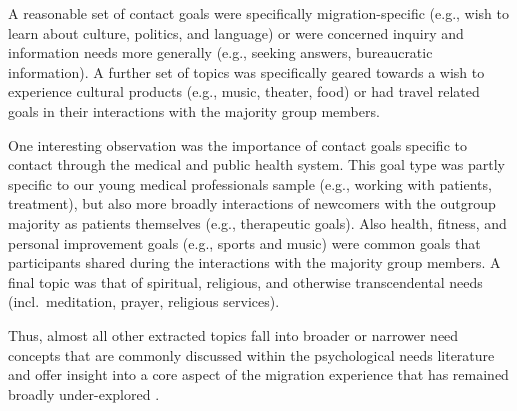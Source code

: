 A reasonable set of contact goals were specifically migration-specific
(e.g., wish to learn about culture, politics, and language) or were
concerned inquiry and information needs more generally (e.g., seeking
answers, bureaucratic information). A further set of topics was
specifically geared towards a wish to experience cultural products
(e.g., music, theater, food) or had travel related goals in their
interactions with the majority group members.

One interesting observation was the importance of contact goals specific
to contact through the medical and public health system. This goal type
was partly specific to our young medical professionals sample (e.g.,
working with patients, treatment), but also more broadly interactions of
newcomers with the outgroup majority as patients themselves (e.g.,
therapeutic goals). Also health, fitness, and personal improvement goals
(e.g., sports and music) were common goals that participants shared
during the interactions with the majority group members. A final topic
was that of spiritual, religious, and otherwise transcendental needs
(incl.~meditation, prayer, religious services).

Thus, almost all other extracted topics fall into broader or narrower
need concepts that are commonly discussed within the psychological needs
literature \citep[e.g.,][]{Orehek2018a} and offer insight into a core
aspect of the migration experience that has remained broadly
under-explored \citep[][]{Kreienkamp2022d}.
